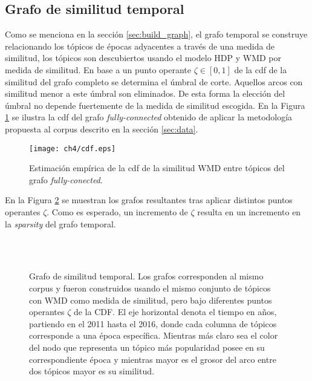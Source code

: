 \subsection{Grafo de similitud temporal}

Como se menciona en la sección \ref{sec:build_graph}, el grafo temporal se construye relacionando los tópicos de épocas adyacentes a través de una medida de similitud, los tópicos son descubiertos usando el modelo HDP y WMD por medida de similitud. En base a un punto operante $\zeta \in [0,1]$ de la cdf de la similitud del grafo completo se determina el úmbral de corte. Aquellos arcos con similitud menor a este úmbral son eliminados. De esta forma la elección del úmbral no depende fuertemente de la medida de similitud escogida. En la Figura \ref{img:cdf_wmd} se ilustra la cdf del grafo \textit{fully-connected} obtenido de aplicar la metodología propuesta al corpus descrito en la sección \ref{sec:data}.

\begin{figure}
    \centering
    \texttt{[image: ch4/cdf.eps]}
    \caption{Estimación empírica de la cdf de la similitud WMD entre tópicos del grafo \textit{fully-conected}.}
    \label{img:cdf_wmd}
\end{figure}

En la Figura \ref{img:temporal_similarity_graphs} se muestran los grafos resultantes tras aplicar distintos puntos operantes $\zeta$. Como es esperado, un incremento de $\zeta$ resulta en un incremento en la \textit{sparsity} del grafo temporal.

\begin{figure}
\centering
{}
\\
\\
\caption{Grafo de similitud temporal. Los grafos corresponden al mismo corpus y fueron construidos usando el mismo conjunto de tópicos con WMD como medida de similitud, pero bajo diferentes puntos operantes $\zeta$ de la CDF. El eje horizontal denota el tiempo en años, partiendo en el 2011 hasta el 2016, donde cada columna de tópicos corresponde a una época específica. Mientras más claro sea el color del nodo que representa un tópico más popularidad posee en su correspondiente época y mientras mayor es el grosor del arco entre dos tópicos mayor es su similitud.}
\label{img:temporal_similarity_graphs}
\end{figure}


